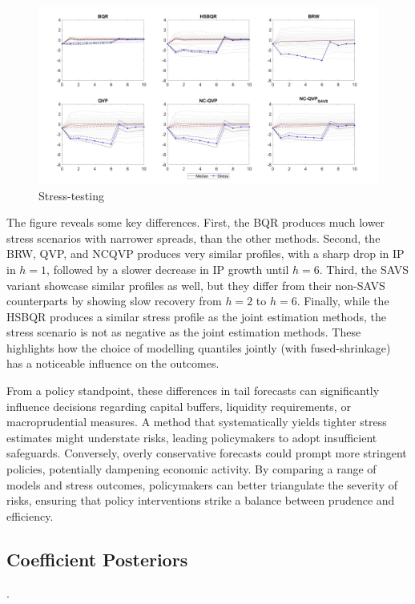 \begin{figure}
    \centering
    \includegraphics[width=\linewidth]{Figures/Forecast.jpg}
    \caption{Stress-testing}
    \label{fig:StressTest}
\end{figure}

The figure reveals some key differences. First, the BQR produces much lower stress scenarios with narrower spreads, than the other methods. Second, the BRW, QVP, and NCQVP produces very similar profiles, with a sharp drop in IP in $h=1$, followed by a slower decrease in IP growth until $h=6$. Third, the SAVS variant showcase similar profiles as well, but they differ from their non-SAVS counterparts by showing slow recovery from $h=2$ to $h=6$. Finally, while the HSBQR produces a similar stress profile as the joint estimation methods, the stress scenario is not as negative as the joint estimation methods. These highlights how the choice of modelling quantiles jointly (with fused-shrinkage) has a noticeable influence on the outcomes. 

From a policy standpoint, these differences in tail forecasts can significantly influence decisions regarding capital buffers, liquidity requirements, or macroprudential measures. A method that systematically yields tighter stress estimates might understate risks, leading policymakers to adopt insufficient safeguards. Conversely, overly conservative forecasts could prompt more stringent policies, potentially dampening economic activity. By comparing a range of models and stress outcomes, policymakers can better triangulate the severity of risks, ensuring that policy interventions strike a balance between prudence and efficiency.

\subsection{Coefficient Posteriors}\label{app-sec:fig-posteriors}{\color{white}.}

